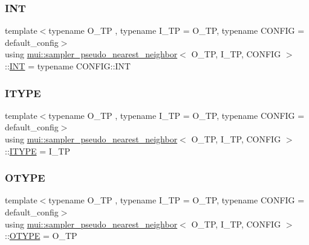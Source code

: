 \subsubsection{\texorpdfstring{I\+NT}{INT}}
{\footnotesize\ttfamily template$<$typename O\+\_\+\+TP , typename I\+\_\+\+TP  = O\+\_\+\+TP, typename C\+O\+N\+F\+IG  = default\+\_\+config$>$ \\
using \hyperlink{classmui_1_1sampler__pseudo__nearest__neighbor}{mui\+::sampler\+\_\+pseudo\+\_\+nearest\+\_\+neighbor}$<$ O\+\_\+\+TP, I\+\_\+\+TP, C\+O\+N\+F\+IG $>$\+::\hyperlink{classmui_1_1sampler__pseudo__nearest__neighbor_aba0be7385a6c5cd5c6a77321399b86c4}{I\+NT} =  typename C\+O\+N\+F\+I\+G\+::\+I\+NT}

\mbox{\label{classmui_1_1sampler__pseudo__nearest__neighbor_a02306f1df2d4fa21d58a35b4466a3ac5}} 
\subsubsection{\texorpdfstring{I\+T\+Y\+PE}{ITYPE}}
{\footnotesize\ttfamily template$<$typename O\+\_\+\+TP , typename I\+\_\+\+TP  = O\+\_\+\+TP, typename C\+O\+N\+F\+IG  = default\+\_\+config$>$ \\
using \hyperlink{classmui_1_1sampler__pseudo__nearest__neighbor}{mui\+::sampler\+\_\+pseudo\+\_\+nearest\+\_\+neighbor}$<$ O\+\_\+\+TP, I\+\_\+\+TP, C\+O\+N\+F\+IG $>$\+::\hyperlink{classmui_1_1sampler__pseudo__nearest__neighbor_a02306f1df2d4fa21d58a35b4466a3ac5}{I\+T\+Y\+PE} =  I\+\_\+\+TP}

\mbox{\label{classmui_1_1sampler__pseudo__nearest__neighbor_a4e8f628c3c9ba7a0a265f19077c32983}} 
\subsubsection{\texorpdfstring{O\+T\+Y\+PE}{OTYPE}}
{\footnotesize\ttfamily template$<$typename O\+\_\+\+TP , typename I\+\_\+\+TP  = O\+\_\+\+TP, typename C\+O\+N\+F\+IG  = default\+\_\+config$>$ \\
using \hyperlink{classmui_1_1sampler__pseudo__nearest__neighbor}{mui\+::sampler\+\_\+pseudo\+\_\+nearest\+\_\+neighbor}$<$ O\+\_\+\+TP, I\+\_\+\+TP, C\+O\+N\+F\+IG $>$\+::\hyperlink{classmui_1_1sampler__pseudo__nearest__neighbor_a4e8f628c3c9ba7a0a265f19077c32983}{O\+T\+Y\+PE} =  O\+\_\+\+TP}

